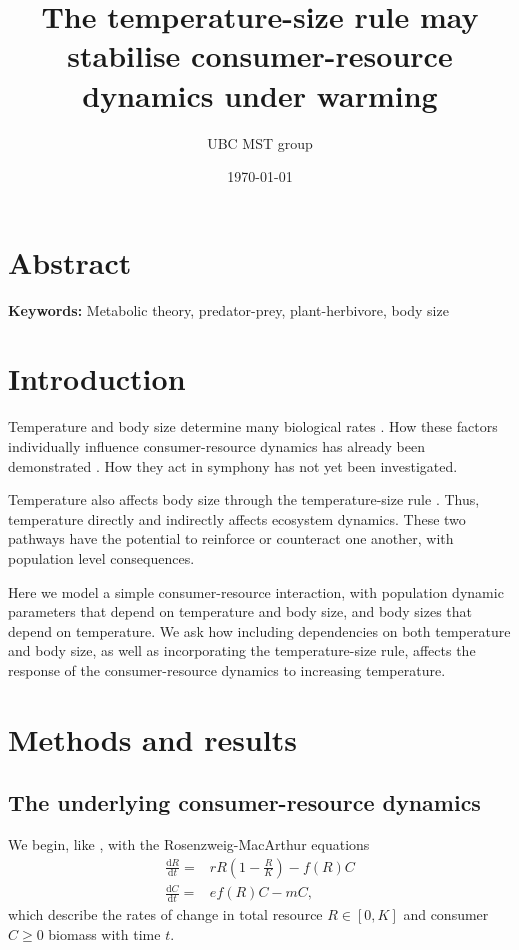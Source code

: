 \documentclass[letter,12pt]{article}
\title{The temperature-size rule may stabilise consumer-resource dynamics under warming}
\date{\today}
\author{UBC MST group}
\begin{document}
\maketitle
\tableofcontents

\section*{Abstract}

\textbf{Keywords:} Metabolic theory, predator-prey, plant-herbivore, body size

\section{Introduction}

Temperature and body size determine many biological rates \cite{West1997,Gillooly2001}.
How these factors individually influence consumer-resource dynamics has already been demonstrated \cite{Gilbert2014,DeLong2015}.
How they act in symphony has not yet been investigated.

Temperature also affects body size through the temperature-size rule \cite{Atkinson1994}.
Thus, temperature directly and indirectly affects ecosystem dynamics.
These two pathways have the potential to reinforce or counteract one another, with population level consequences.

Here we model a simple consumer-resource interaction, with population dynamic parameters that depend on temperature and body size, and body sizes that depend on temperature.
We ask how including dependencies on both temperature and body size, as well as incorporating the temperature-size rule, affects the response of the consumer-resource dynamics to increasing temperature.

\section{Methods and results}

\subsection{The underlying consumer-resource dynamics}

We begin, like \cite{Gilbert2014}, with the Rosenzweig-MacArthur equations \cite{Rosenzweig1963}
\begin{equation}\label{eq:RM}
\begin{aligned}
\frac{\mathrm{d}R}{\mathrm{d}t} =& r R \left(1 - \frac{R}{K} \right) - f(R) C\\
\frac{\mathrm{d}C}{\mathrm{d}t} =& e f(R) C - m C,
\end{aligned}
\end{equation}
which describe the rates of change in total resource $R\in[0,K]$ and consumer $C\geq0$ biomass with time $t$.
\end{document}

